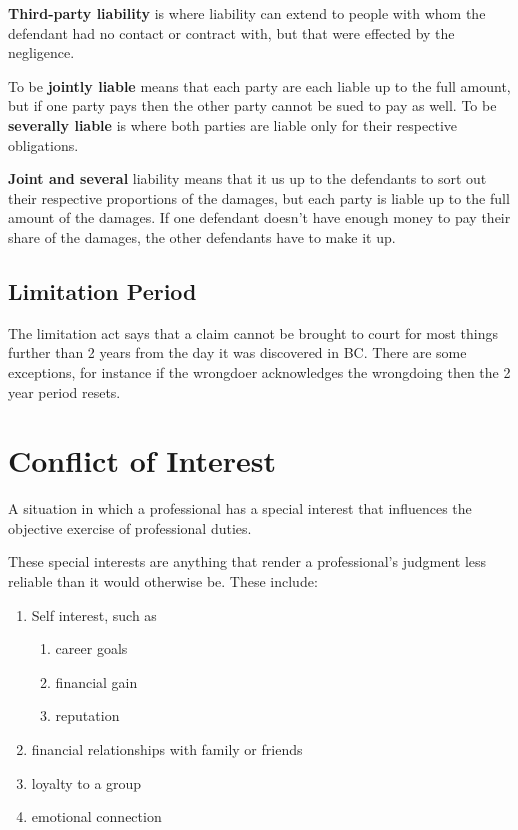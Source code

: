 \documentclass{article}
\begin{document}
\textbf{Third-party liability} is where liability can extend to people with whom the defendant had no contact or contract with, but that were effected by the negligence.

To be \textbf{jointly liable} means that each party are each liable up to the full amount, but if one party pays then the other party cannot be sued to pay as well. To be \textbf{severally liable} is where both parties are liable only for their respective obligations.  

\textbf{Joint and several} liability means that it us up to the defendants to sort out their respective proportions of the damages, but each party is liable up to the full amount of the damages. If  one defendant doesn't have enough money to pay their share of the damages, the other defendants have to make it up.

\subsection{Limitation Period}

The limitation act says that a claim cannot be brought to court for most things further than 2 years from the day it was discovered in BC. There are some exceptions, for instance if the wrongdoer acknowledges the wrongdoing then the 2 year period resets.


\section{Conflict of Interest}

A situation in which a professional has a special interest that influences the objective exercise of professional duties.

These special interests are anything that render a professional's judgment less reliable than it would otherwise be. These include: \begin{enumerate}
\item Self interest, such as \begin{enumerate}
\item career goals
\item financial gain
\item reputation
\end{enumerate}
\item financial relationships with family or friends
\item loyalty to a group
\item emotional connection
\end{enumerate}
\end{document}
